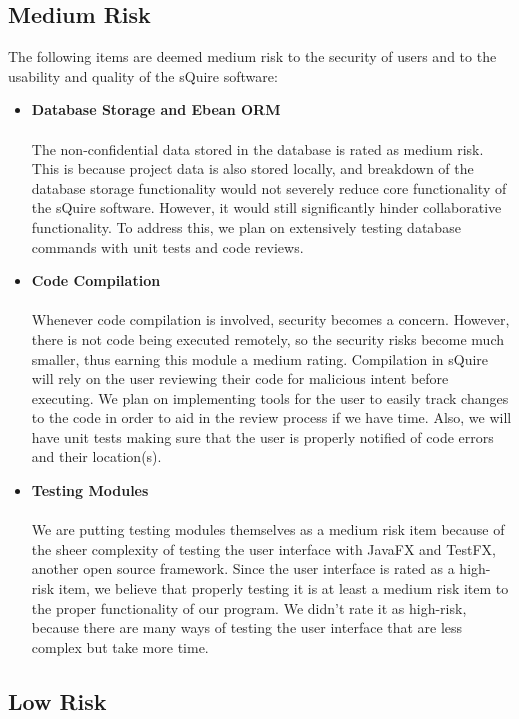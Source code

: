 \documentclass[14pt, a4paper]{article}
\begin{document}
\subsection{Medium Risk}

The following items are deemed medium risk to the security of users and to the usability and quality of the sQuire software:

\begin{itemize}
	\item \textbf{Database Storage and Ebean ORM} \\ \\
	The non-confidential data stored in the database is rated as medium risk. This is because project data is also stored locally, and breakdown of the database storage functionality would not severely reduce core functionality of the sQuire software. However, it would still significantly hinder collaborative functionality. To address this, we plan on extensively testing database commands with unit tests and code reviews.
	
	\item \textbf{Code Compilation} \\ \\
	Whenever code compilation is involved, security becomes a concern. However, there is not code being executed remotely, so the security risks become much smaller, thus earning this module a medium rating. Compilation in sQuire will rely on the user reviewing their code for malicious intent before executing. We plan on implementing tools for the user to easily track changes to the code in order to aid in the review process if we have time. Also, we will have unit tests making sure that the user is properly notified of code errors and their location(s).
	
	\item \textbf{Testing Modules} \\ \\
	We are putting testing modules themselves as a medium risk item because of the sheer complexity of testing the user interface with JavaFX and TestFX, another open source framework. Since the user interface is rated as a high-risk item, we believe that properly testing it is at least a medium risk item to the proper functionality of our program. We didn't rate it as high-risk, because there are many ways of testing the user interface that are less complex but take more time.
\end{itemize}

\subsection{Low Risk}
\end{document}
